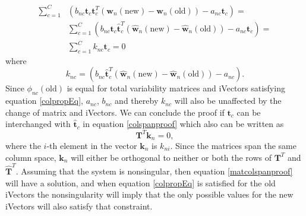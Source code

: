 \begin{align}
\sum_{c=1}^C & \left( b_{nc} \mathbf{t}_c \mathbf{t}_c^T(\mathbf{w}_n(\text{new})-\mathbf{w}_n(\text{old})) - a_{nc} \mathbf{t}_c \right) =  \nonumber \\
& \sum_{c=1}^C \left( b_{nc} \mathbf{t}_c \mathbf{\hat{t}}_c^T(\mathbf{\hat{w}}_n(\text{new})-\mathbf{\hat{w}}_n(\text{old})) - a_{nc} \mathbf{t}_c \right) = \nonumber \\
& \sum_{c=1}^C k_{nc} \mathbf{t}_c = 0 \label{colspanproof}
\end{align}
where
\begin{equation*}
k_{nc} = \left(b_{nc}\mathbf{\hat{t}}_c^T(\mathbf{\hat{w}}_n(\text{new})-\mathbf{\hat{w}}_n(\text{old})) - a_{nc}\right).
\end{equation*}
Since $\phi_{nc}(\text{old})$ is equal for total variability matrices and iVectors satisfying equation \ref{colpropEq}, $a_{nc}$, $b_{nc}$ and thereby $k_{nc}$ will also be unaffected by the change of matrix and iVectors. We can conclude the proof if $\mathbf{t}_c$ can be interchanged with $\mathbf{\hat{t}}_c$ in equation \ref{colspanproof} which also can be written as
\begin{equation}
\label{matcolspanproof}
\mathbf{T}^T \mathbf{k}_n = 0,
\end{equation}
where the $i$-th element in the vector $\mathbf{k}_n$ is $k_{ni}$. Since the matrices span the same column space, $\mathbf{k}_n$ will either be orthogonal to neither or both the rows of  $\mathbf{T}^T$ and $\mathbf{\hat{T}}^T$. Assuming that the system is nonsingular, then equation \ref{matcolspanproof} will have a solution, and when equation \ref{colpropEq} is satisfied for the old iVectors the nonsingularity will imply that the only possible values for the new iVectors will also satisfy that constraint.
